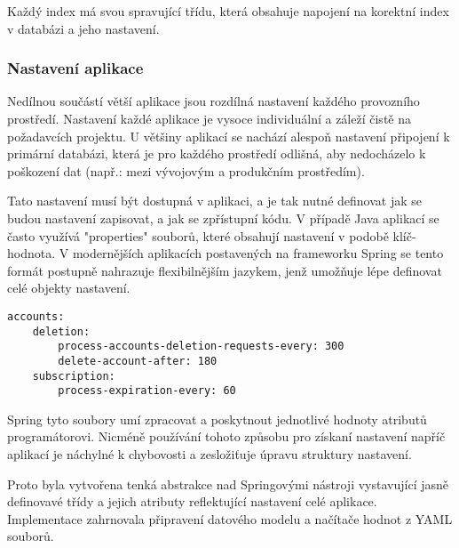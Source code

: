 
		Každý index má svou spravující třídu, která obsahuje napojení na korektní index v databázi a jeho nastavení.

		\subsubsection{Nastavení aplikace}

		Nedílnou součástí větší aplikace jsou rozdílná nastavení každého provozního prostředí.
		Nastavení každé aplikace je vysoce individuální a záleží čistě na požadavcích projektu.
		U většiny aplikací se nachází alespoň nastavení připojení k primární databázi, která je pro každého prostředí
		odlišná, aby nedocházelo k poškození dat (např.: mezi vývojovým a produkčním prostředím).

		Tato nastavení musí být dostupná v aplikaci, a je tak nutné definovat jak se budou nastavení zapisovat, a jak se
		zpřístupní kódu.
		V případě Java aplikací se často využívá "properties" souborů, které obsahují nastavení v podobě klíč-hodnota.
		V modernějších aplikacích postavených na frameworku Spring se tento formát postupně nahrazuje flexibilnějším
		 jazykem, jenž umožňuje lépe definovat celé objekty nastavení.

		\newpage

		\begin{lstlisting}[caption={Ukázka části nastavení aplikace v YAML konfiguračním souboru. Zdroj: [autor]}]
accounts:
	deletion:
		process-accounts-deletion-requests-every: 300
		delete-account-after: 180
	subscription:
		process-expiration-every: 60
		\end{lstlisting}

		Spring tyto soubory umí zpracovat a poskytnout jednotlivé hodnoty atributů programátorovi.
		Nicméně používání tohoto způsobu pro získaní nastavení napříč aplikací je náchylné k chybovosti a
		zesložiťuje úpravu struktury nastavení.

		Proto byla vytvořena tenká abstrakce nad Springovými nástroji vystavující jasně definovavé třídy a jejich atributy
		reflektující nastavení celé aplikace.
		Implementace zahrnovala připravení datového modelu a načítače hodnot z \ac{YAML} souborů.


